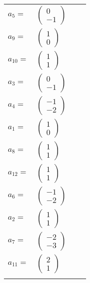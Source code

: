 \documentclass[1p]{elsarticle_modified}
\theoremstyle{definition}
\begin{document}
\begin{tabular}{m{7pt} m{180pt} m{7pt} m{180pt} }
\flushright $a_{5}=$&$\begin{pmatrix}0\\-1\end{pmatrix}$ \\
\flushright $a_{9}=$&$\begin{pmatrix}1\\0\end{pmatrix}$ \\
\flushright $a_{10}=$&$\begin{pmatrix}1\\1\end{pmatrix}$ \\
\flushright $a_{3}=$&$\begin{pmatrix}0\\-1\end{pmatrix}$ \\
\flushright $a_{4}=$&$\begin{pmatrix}-1\\-2\end{pmatrix}$ \\
\flushright $a_{1}=$&$\begin{pmatrix}1\\0\end{pmatrix}$ \\
\flushright $a_{8}=$&$\begin{pmatrix}1\\1\end{pmatrix}$ \\
\flushright $a_{12}=$&$\begin{pmatrix}1\\1\end{pmatrix}$ \\
\flushright $a_{6}=$&$\begin{pmatrix}-1\\-2\end{pmatrix}$ \\
\flushright $a_{2}=$&$\begin{pmatrix}1\\1\end{pmatrix}$ \\
\flushright $a_{7}=$&$\begin{pmatrix}-2\\-3\end{pmatrix}$ \\
\flushright $a_{11}=$&$\begin{pmatrix}2\\1\end{pmatrix}$\\&\end{tabular}
\end{document}
